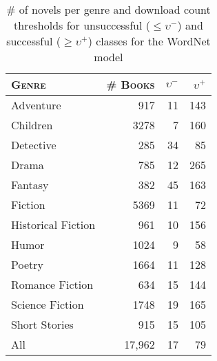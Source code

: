 \begin{table}[!t]
    \caption{\# of novels per genre and download count thresholds for unsuccessful ($\leq\upsilon^-$) and successful ($\geq\upsilon^+$) classes for the WordNet model}
    \label{tab:thresholds}
    \begin{tabular}{lrrr}
        \centering
        \textsc{Genre} & \textsc{\# Books} & $\upsilon^-$ & $\upsilon^+$ \\
        \hline
        Adventure & 917 & 11 & 143 \\
        Children & 3278 & 7 & 160 \\
        Detective & 285 & 34 & 85 \\
        Drama & 785 & 12 & 265 \\
        Fantasy & 382 & 45 & 163 \\
        Fiction & 5369 & 11 & 72 \\
        Historical Fiction & 961 & 10 & 156 \\
        Humor & 1024 & 9 & 58 \\
        Poetry & 1664 & 11 & 128 \\
        Romance Fiction & 634 & 15 & 144 \\
        Science Fiction & 1748 & 19 & 165 \\
        Short Stories & 915 & 15 & 105 \\
        All & 17,962 & 17 & 79 \\
        \hline
    \end{tabular}
\end{table}